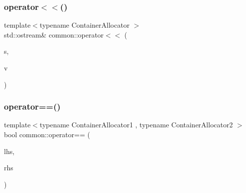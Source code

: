 \mbox{\label{namespacecommon_ab88da1e27722dfe7cfc22f6106e01016}} 
\subsubsection{\texorpdfstring{operator$<$$<$()}{operator<<()}\hspace{0.1cm}{\footnotesize\ttfamily [2/2]}}
{\footnotesize\ttfamily template$<$typename Container\+Allocator $>$ \\
std\+::ostream\& common\+::operator$<$$<$ (\begin{DoxyParamCaption}\item[{std\+::ostream \&}]{s,  }\item[{const \+::\hyperlink{structcommon_1_1EgoPointClouds__}{common\+::\+Ego\+Point\+Clouds\+\_\+}$<$ Container\+Allocator $>$ \&}]{v }\end{DoxyParamCaption})}

\mbox{\label{namespacecommon_a7c09f723fcbe2e36f39855e3b7ece998}} 
\subsubsection{\texorpdfstring{operator==()}{operator==()}\hspace{0.1cm}{\footnotesize\ttfamily [1/2]}}
{\footnotesize\ttfamily template$<$typename Container\+Allocator1 , typename Container\+Allocator2 $>$ \\
bool common\+::operator== (\begin{DoxyParamCaption}\item[{const \+::\hyperlink{structcommon_1_1PointCloudSensor__}{common\+::\+Point\+Cloud\+Sensor\+\_\+}$<$ Container\+Allocator1 $>$ \&}]{lhs,  }\item[{const \+::\hyperlink{structcommon_1_1PointCloudSensor__}{common\+::\+Point\+Cloud\+Sensor\+\_\+}$<$ Container\+Allocator2 $>$ \&}]{rhs }\end{DoxyParamCaption})}

\mbox{\label{namespacecommon_af4bbfa6ad580ed64356a91d0f46fd59a}} 
